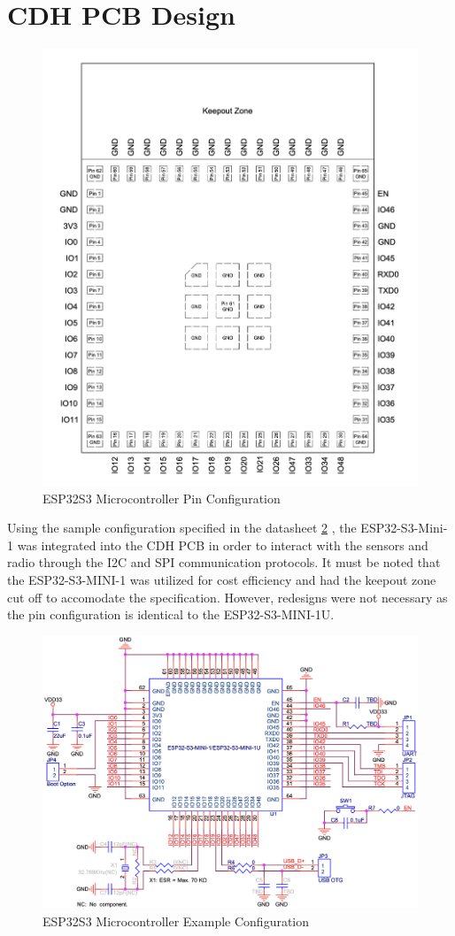 \documentclass{report}
\begin{document}
        \section{CDH PCB Design}
            \begin{figure}[H]
                \centering
                \includegraphics[width=0.4\linewidth]{figures/MC_PINS.png}
                \caption{ESP32S3 Microcontroller Pin Configuration}
                \label{fig:mc_pins}
            \end{figure}
            Using the sample configuration specified in the datasheet \ref{fig:mc_example} \cite{esp32s3mini}, 
            the ESP32-S3-Mini-1 was integrated into the CDH PCB in order to interact with 
            the sensors and radio through the I2C and SPI communication protocols.
            It must be noted that the ESP32-S3-MINI-1 was utilized for cost efficiency and had the keepout zone cut off to accomodate the 
            specification. However, redesigns were not necessary as the pin configuration is identical to the ESP32-S3-MINI-1U.
            \begin{figure}[H]
                \centering
                \includegraphics[width=0.4\linewidth]{figures/ESP32S3_EXAMPLE.png}
                \caption{ESP32S3 Microcontroller Example Configuration}
                \label{fig:mc_example}
            \end{figure}
\end{document}
